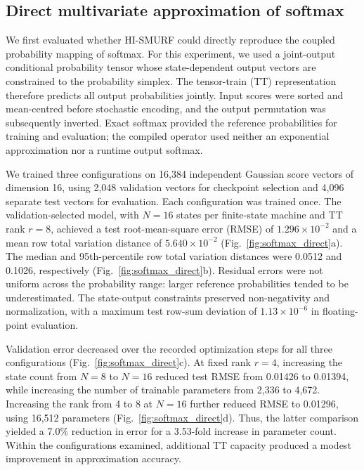 \subsection{Direct multivariate approximation of softmax}
\label{sec:softmax_approximation}

We first evaluated whether HI-SMURF could directly reproduce the coupled
probability mapping of softmax. For this experiment, we used a joint-output
conditional probability tensor whose state-dependent output vectors are
constrained to the probability simplex. The tensor-train (TT) representation
therefore predicts all output probabilities jointly. Input scores were sorted
and mean-centred before stochastic encoding, and the output permutation was
subsequently inverted. Exact softmax provided the reference probabilities for
training and evaluation; the compiled operator used neither an exponential
approximation nor a runtime output softmax.

We trained three configurations on 16,384 independent Gaussian score vectors
of dimension 16, using 2,048 validation vectors for checkpoint selection and
4,096 separate test vectors for evaluation. Each configuration was trained
once. The validation-selected model, with $N=16$ states per finite-state
machine and TT rank $r=8$, achieved a test root-mean-square error (RMSE) of
$1.296\times10^{-2}$ and a mean row total variation distance of
$5.640\times10^{-2}$ (Fig.~\ref{fig:softmax_direct}a).
The median and 95th-percentile row total variation distances were 0.0512 and
0.1026, respectively (Fig.~\ref{fig:softmax_direct}b). Residual errors
were not uniform across the probability range: larger reference probabilities
tended to be underestimated. The state-output constraints preserved
non-negativity and normalization, with a maximum test row-sum deviation of
$1.13\times10^{-6}$ in floating-point evaluation.

Validation error decreased over the recorded optimization steps for all three
configurations (Fig.~\ref{fig:softmax_direct}c). At fixed rank $r=4$,
increasing the state count from $N=8$ to $N=16$ reduced test RMSE from 0.01426
to 0.01394, while increasing the number of trainable parameters from 2,336 to
4,672. Increasing the rank from 4 to 8 at $N=16$ further reduced RMSE to
0.01296, using 16,512 parameters (Fig.~\ref{fig:softmax_direct}d).
Thus, the latter comparison yielded a 7.0\% reduction in error for a
3.53-fold increase in parameter count. Within the configurations examined,
additional TT capacity produced a modest improvement in approximation accuracy.

